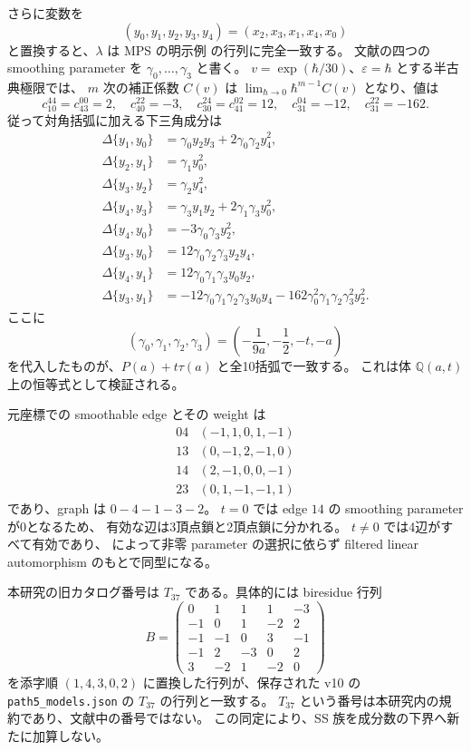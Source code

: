 さらに変数を
\[
 (y_0,y_1,y_2,y_3,y_4)=(x_2,x_3,x_1,x_4,x_0)
\]
と置換すると、$\lambda$ は MPS の明示例
\cite[Example 5.6]{MPSquantum} の行列に完全一致する。
文献の四つの smoothing parameter を
$\gamma_0,\ldots,\gamma_3$ と書く。
$v=\exp(\hbar/30)$、$\varepsilon=\hbar$ とする半古典極限では、
$m$ 次の補正係数 $C(v)$ は
$\lim_{\hbar\to0}\hbar^{m-1}C(v)$ となり、値は
\[
 c_{10}^{44}=c_{43}^{00}=2,\quad c_{40}^{22}=-3,\quad
 c_{30}^{24}=c_{41}^{02}=12,\quad c_{31}^{04}=-12,\quad c_{31}^{22}=-162.
\]
従って対角括弧に加える下三角成分は
\begin{align*}
 \Delta\{y_1,y_0\}&=\gamma_0y_2y_3+2\gamma_0\gamma_2y_4^2,\\
 \Delta\{y_2,y_1\}&=\gamma_1y_0^2,\\
 \Delta\{y_3,y_2\}&=\gamma_2y_4^2,\\
 \Delta\{y_4,y_3\}&=\gamma_3y_1y_2+2\gamma_1\gamma_3y_0^2,\\
 \Delta\{y_4,y_0\}&=-3\gamma_0\gamma_3y_2^2,\\
 \Delta\{y_3,y_0\}&=12\gamma_0\gamma_2\gamma_3y_2y_4,\\
 \Delta\{y_4,y_1\}&=12\gamma_0\gamma_1\gamma_3y_0y_2,\\
 \Delta\{y_3,y_1\}&=-12\gamma_0\gamma_1\gamma_2\gamma_3y_0y_4
                  -162\gamma_0^2\gamma_1\gamma_2\gamma_3^2y_2^2.
\end{align*}
ここに
\[
 \boxed{(\gamma_0,\gamma_1,\gamma_2,\gamma_3)
 =\left(-\frac1{9a},-\frac12,-t,-a\right)}
\]
を代入したものが、$P(a)+t\tau(a)$ と全10括弧で一致する。
これは体 $\mathbb Q(a,t)$ 上の恒等式として検証される。

元座標での smoothable edge とその weight は
\[
\begin{array}{c|c}
04&(-1,1,0,1,-1)\\
13&(0,-1,2,-1,0)\\
14&(2,-1,0,0,-1)\\
23&(0,1,-1,-1,1)
\end{array}
\]
であり、graph は $0-4-1-3-2$。
$t=0$ では edge $14$ の smoothing parameter が0となるため、
有効な辺は3頂点鎖と2頂点鎖に分かれる。
$t\ne0$ では4辺がすべて有効であり、
\cite[Theorem 7.5]{MPSquantum} によって非零 parameter の選択に依らず
filtered linear automorphism のもとで同型になる。

本研究の旧カタログ番号は $T_{37}$ である。具体的には biresidue 行列
\[
 B=\begin{pmatrix}
 0&1&1&1&-3\\
 -1&0&1&-2&2\\
 -1&-1&0&3&-1\\
 -1&2&-3&0&2\\
 3&-2&1&-2&0
 \end{pmatrix}
\]
を添字順 $(1,4,3,0,2)$ に置換した行列が、保存された v10 の
\texttt{path5\_models.json} の $T_{37}$ の行列と一致する。
$T_{37}$ という番号は本研究内の規約であり、文献中の番号ではない。
この同定により、SS 族を成分数の下界へ新たに加算しない。

